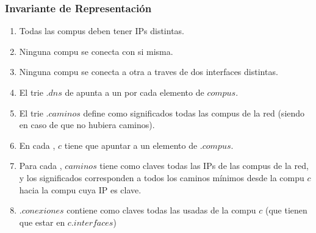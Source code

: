 \subsubsection{Invariante de Representación}
  \begin{enumerate}

  \item Todas las compus deben tener IPs distintas.

  \item Ninguna compu se conecta con si misma.

  \item Ninguna compu se conecta a otra a traves de dos interfaces distintas.

  \item El trie .$dns$ de apunta a un 
        por cada elemento de $compus$.

  \item El trie .$caminos$ define como significados todas
        las compus de la red (siendo  en caso de que no hubiera caminos).

  \item En cada , $c$ tiene que apuntar a un elemento de .$compus$.

  \item Para cada , $caminos$ tiene como claves todas las
        IPs de las compus de la red, y los significados corresponden a todos los caminos
        mínimos desde la compu $c$ hacia la compu cuya IP es clave.

  \item {}.$conexiones$ contiene como claves todas las
         usadas de la compu $c$ (que tienen que estar en $c$.$interfaces$)

  \end{enumerate}

  \Rep[estr][e]{

  }

